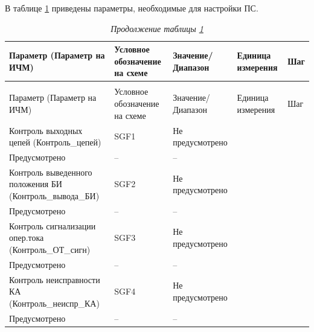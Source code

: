 \par
В таблице \ref{ps:tbl1} приведены параметры, необходимые для настройки ПС. 

\footnotesize
\begin{longtable}{|>{\centering\arraybackslash}m{5.3cm}|>{\centering\arraybackslash}m{3.3cm}|>{\centering\arraybackslash}m{4.2cm}|>{\centering\arraybackslash}m{1.8cm}|>{\centering\arraybackslash}m{1cm}|}
\caption{Параметры для настройки функции «ПС»\hfill\vspace{-0.5\baselineskip}}\label{ps:tbl1}\\ 
\hline
\rowcolor{gray!20}
Параметр (Параметр на ИЧМ) & Условное обозначение на схеме & Значение/ Диапазон & Единица измерения & Шаг \\ 
\hline
\endfirsthead
\caption*{\hspace{3pt}\emph{Продолжение таблицы \ref{ps:tbl1}\hfill\vspace{-0.5\baselineskip}}} \\ %
\hline
\rowcolor{gray!20}
Параметр (Параметр на ИЧМ) & Условное обозначение на схеме & Значение/ Диапазон & Единица измерения & Шаг \\ 
\endhead
\endfoot
\endlastfoot
\centering Контроль выходных цепей (Контроль\_цепей)  & \centering SGF1 & \centering Не предусмотрено \\ Предусмотрено & \centering -- & \centering \arraybackslash -- \\
\hline
\centering Контроль выведенного положения БИ (Контроль\_вывода\_БИ)  & \centering SGF2 & \centering Не предусмотрено \\ Предусмотрено & \centering -- & \centering \arraybackslash -- \\
\hline
\centering Контроль сигнализации опер.тока (Контроль\_ОТ\_сигн)  & \centering SGF3 & \centering Не предусмотрено \\ Предусмотрено & \centering -- & \centering \arraybackslash -- \\
\hline
\centering Контроль неисправности КА (Контроль\_неиспр\_КА)  & \centering SGF4 & \centering Не предусмотрено \\ Предусмотрено & \centering -- & \centering \arraybackslash -- \\

\end{longtable}
